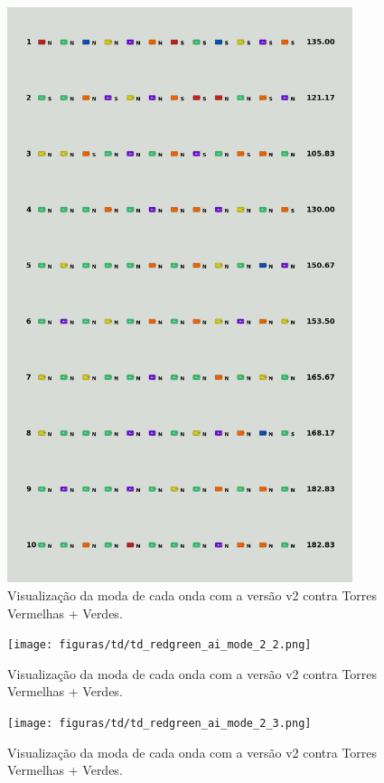 \begin{figure}[H]
  \centering
  \includegraphics[width=0.9\textwidth]{figuras/td/td_redgreen_ai_mode_2_1.png}
  \caption{Visualização da moda de cada onda com a versão v2 contra Torres Vermelhas + Verdes.}
  \label{fig:td-moda-redgreen-2-1}
\end{figure}

\begin{figure}[H]
  \centering
  \texttt{[image: figuras/td/td\_redgreen\_ai\_mode\_2\_2.png]}
  \caption{Visualização da moda de cada onda com a versão v2 contra Torres Vermelhas + Verdes.}
  \label{fig:td-moda-redgreen-2-2}
\end{figure}

\begin{figure}[H]
  \centering
  \texttt{[image: figuras/td/td\_redgreen\_ai\_mode\_2\_3.png]}
  \caption{Visualização da moda de cada onda com a versão v2 contra Torres Vermelhas + Verdes.}
  \label{fig:td-moda-redgreen-2-3}
\end{figure}